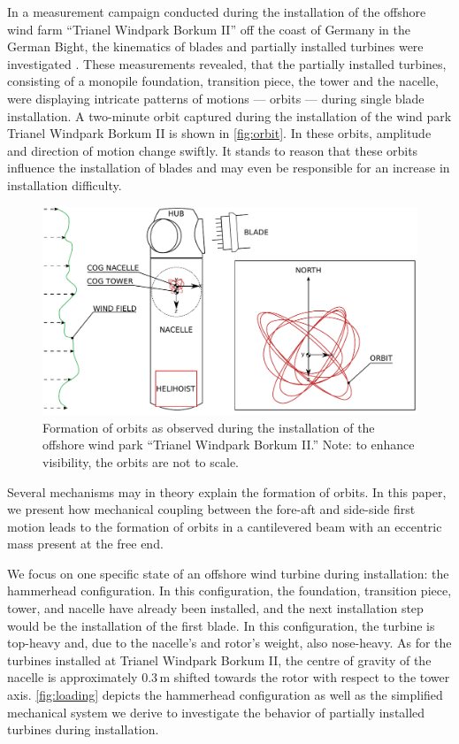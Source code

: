 \documentclass{article}
\begin{document}
\clearpage

In a measurement campaign conducted during the installation of the offshore wind farm ``Trianel Windpark Borkum II'' off the coast of Germany in the German Bight, the kinematics of blades and partially installed turbines were investigated \citep{sanderRelativeMotionSingle2020,  sanderMONITORINGOFFSHOREWIND2020, sanderOscillationsOffshoreWind2020}. These measurements revealed, that the partially installed turbines, consisting of a monopile foundation, transition piece, the tower and the nacelle, were displaying intricate patterns of motions — orbits — during single blade installation. A two-minute orbit captured during the installation of the wind park Trianel Windpark Borkum II is shown in \autoref{fig:orbit}. In these orbits, amplitude and direction of motion change swiftly. It stands to reason that these orbits influence the installation of blades and may even be responsible for an increase in installation difficulty.

\begin{figure}
    \centering
    \includegraphics[width=0.7\linewidth]{figures/installation_alt5.pdf}
    \caption{Formation of orbits as observed during the installation of the offshore wind park ``Trianel Windpark Borkum II.'' Note: to enhance visibility, the orbits are not to scale.}
    \label{fig:orbit}
\end{figure}

Several mechanisms may in theory explain the formation of orbits. In this paper, we present how mechanical coupling between the fore-aft and side-side first motion leads to the formation of orbits in a cantilevered beam with an eccentric mass present at the free end. 

We focus on one specific state of an offshore wind turbine during installation: the hammerhead configuration. In this configuration, the foundation, transition piece, tower, and nacelle have already been installed, and the next installation step would be the installation of the first blade. In this configuration, the turbine is top-heavy and, due to the nacelle's and rotor's weight, also nose-heavy. As for the turbines installed at Trianel Windpark Borkum II, the centre of gravity of the nacelle is approximately 0.3\,m shifted towards the rotor with respect to the tower axis. \autoref{fig:loading} depicts the hammerhead configuration as well as the simplified mechanical system we derive to investigate the behavior of partially installed turbines during installation. 
\end{document}
